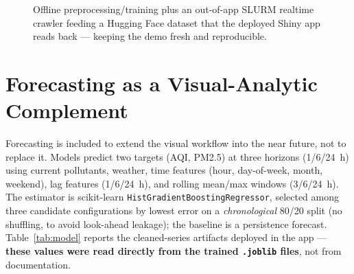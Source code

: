 \documentclass[a4paper]{article}
\begin{document}
\begin{figure}[h]
\centering
{}
\caption{Offline preprocessing/training plus an out-of-app SLURM realtime crawler feeding a Hugging Face
dataset that the deployed Shiny app reads back --- keeping the demo fresh and reproducible.}
\label{fig:arch}
\end{figure}

\section{Forecasting as a Visual-Analytic Complement}
Forecasting is included to extend the visual workflow into the near future, not to replace it. Models
predict two targets (AQI, PM2.5) at three horizons (1/6/24~h) using current pollutants, weather, time
features (hour, day-of-week, month, weekend), lag features (1/6/24~h), and rolling mean/max windows
(3/6/24~h). The estimator is scikit-learn \texttt{HistGradientBoostingRegressor}, selected among three
candidate configurations by lowest error on a \emph{chronological} 80/20 split (no shuffling, to avoid
look-ahead leakage); the baseline is a persistence forecast. Table~\ref{tab:model} reports the cleaned-series
artifacts deployed in the app --- \textbf{these values were read directly from the trained
\texttt{.joblib} files}, not from documentation.
\end{document}
